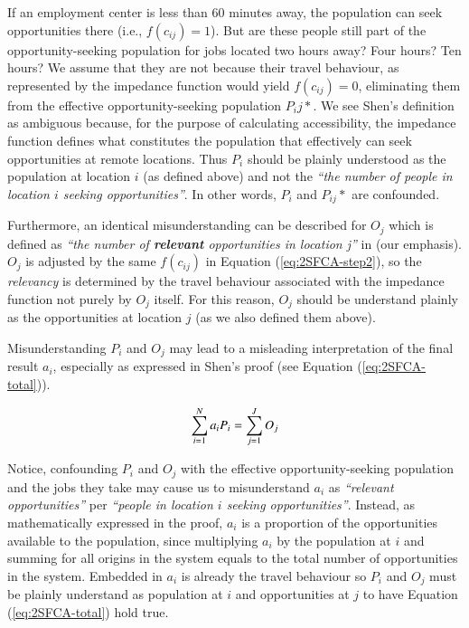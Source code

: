 \documentclass[]{elsarticle} %
\begin{document}
If an employment center is less than 60 minutes away, the population can
seek opportunities there (i.e., \(f(c_{ij})=1\)). But are these people
still part of the opportunity-seeking population for jobs located two
hours away? Four hours? Ten hours? We assume that they are not because
their travel behaviour, as represented by the impedance function would
yield \(f(c_{ij})=0\), eliminating them from the effective
opportunity-seeking population \(P_ij*\). We see Shen's definition as
ambiguous because, for the purpose of calculating accessibility, the
impedance function defines what constitutes the population that
effectively can seek opportunities at remote locations. Thus \(P_i\)
should be plainly understood as the population at location \(i\) (as
defined above) and not the \emph{``the number of people in location
\(i\) seeking opportunities''}. In other words, \(P_i\) and \(P_{ij}*\)
are confounded.

Furthermore, an identical misunderstanding can be described for \(O_j\)
which is defined as \emph{``the number of \textbf{relevant}
opportunities in location j''} in \citet{shen1998} (our emphasis).
\(O_j\) is adjusted by the same \(f(c_{ij})\) in Equation
(\ref{eq:2SFCA-step2}), so the \emph{relevancy} is determined by the
travel behaviour associated with the impedance function not purely by
\(O_j\) itself. For this reason, \(O_j\) should be understand plainly as
the opportunities at location \(j\) (as we also defined them above).

Misunderstanding \(P_i\) and \(O_j\) may lead to a misleading
interpretation of the final result \(a_i\), especially as expressed in
Shen's proof (see Equation (\ref{eq:2SFCA-total})).

\begin{equation}
\label{eq:2SFCA-total}
\sum_{i=1}^N a_{i} P_i= \sum_{j=1}^JO_j\\
\end{equation}

Notice, confounding \(P_i\) and \(O_j\) with the effective
opportunity-seeking population and the jobs they take may cause us to
misunderstand \(a_{i}\) as \emph{``relevant opportunities''} per
\emph{``people in location \(i\) seeking opportunities''}. Instead, as
mathematically expressed in the proof, \(a_{i}\) is a proportion of the
opportunities available to the population, since multiplying \(a_i\) by
the population at \(i\) and summing for all origins in the system equals
to the total number of opportunities in the system. Embedded in \(a_i\)
is already the travel behaviour so \(P_i\) and \(O_j\) must be plainly
understand as population at \(i\) and opportunities at \(j\) to have
Equation (\ref{eq:2SFCA-total}) hold true.
\end{document}
